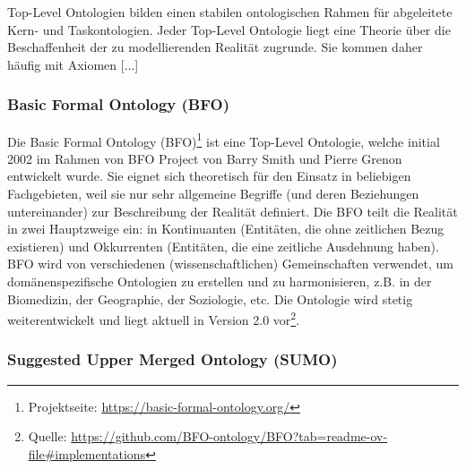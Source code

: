\documentclass{article}
\begin{document}
Top-Level Ontologien bilden einen stabilen ontologischen Rahmen für abgeleitete Kern- und Taskontologien.
Jeder Top-Level Ontologie liegt eine Theorie über die Beschaffenheit der zu modellierenden Realität zugrunde.
Sie kommen daher häufig mit Axiomen [...]

\subsubsection{Basic Formal Ontology (BFO)}

Die Basic Formal Ontology (BFO)\footnote{Projektseite: \url{https://basic-formal-ontology.org/}} ist eine Top-Level Ontologie, welche initial 2002 im Rahmen von BFO Project von Barry Smith und Pierre Grenon entwickelt wurde.
Sie eignet sich theoretisch für den Einsatz in beliebigen Fachgebieten, weil sie nur sehr allgemeine Begriffe (und deren Beziehungen untereinander) zur Beschreibung der Realität definiert.
Die BFO teilt die Realität in zwei Hauptzweige ein: in Kontinuanten (Entitäten, die ohne zeitlichen Bezug existieren) und Okkurrenten (Entitäten, die eine zeitliche Ausdehnung haben).
BFO wird von verschiedenen (wissenschaftlichen) Gemeinschaften verwendet, um domänenspezifische Ontologien zu erstellen und zu harmonisieren, z.B. in der Biomedizin, der Geographie, der Soziologie, etc.
Die Ontologie wird stetig weiterentwickelt und liegt aktuell in Version 2.0 vor\footnote{Quelle: \url{https://github.com/BFO-ontology/BFO?tab=readme-ov-file\#implementations}}.

\subsubsection{Suggested Upper Merged Ontology (SUMO)}
\end{document}
